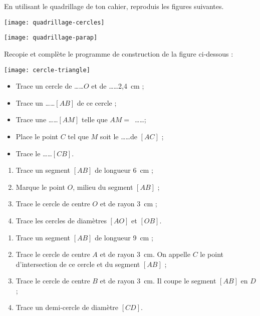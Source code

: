 \begin{exercice}
En utilisant le quadrillage de ton cahier, reproduis les figures suivantes.
\begin{colenumerate}{2}
 \item
 
 \texttt{[image: quadrillage-cercles]}
 \item
 
\texttt{[image: quadrillage-parap]}

 \end{colenumerate}
\end{exercice}


\begin{exercice}
Recopie et complète le programme de construction de la figure ci‑dessous :
\begin{center}  \texttt{[image: cercle-triangle]} \end{center}
\begin{itemize}
 \item Trace un cercle de \ldots \ldots $O$ et de \ldots \ldots 2,4 cm ;
 \item Trace un \ldots \ldots $[AB]$ de ce cercle ;
 \item Trace une \ldots \ldots $[AM]$ telle que $AM =$ \ldots \ldots ;
 \item Place le point $C$ tel que $M$ soit le \ldots \ldots de $[AC]$ ;
 \item Trace le \ldots \ldots $[CB]$.
 \end{itemize}
\end{exercice}


\begin{exercice}[À construire]
\begin{enumerate}
 \item Trace un segment $[AB]$ de longueur 6 cm ;
 \item Marque le point $O$, milieu du segment $[AB]$ ;
 \item Trace le cercle de centre $O$ et de rayon 3 cm ;
 \item Trace les cercles de diamètres $[AO]$ et $[OB]$.
 \end{enumerate}
\end{exercice}


\begin{exercice}
\begin{enumerate}
 \item Trace un segment $[AB]$ de longueur 9 cm ;
 \item Trace le cercle de centre $A$ et de rayon 3 cm. On appelle $C$ le point d'intersection de ce cercle et du segment $[AB]$ ;
 \item Trace le cercle de centre $B$ et de rayon 3 cm. Il coupe le segment $[AB]$ en $D$ ;
 \item Trace un demi‑cercle de diamètre $[CD]$.
 \end{enumerate}
\end{exercice}


